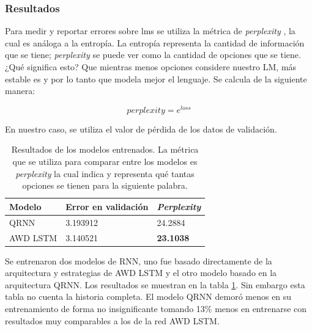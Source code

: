\subsubsection{Resultados}

Para medir y reportar errores sobre \glspl{lm} se utiliza la métrica de \textit{perplexity} \parencite{jurafsky2014speech}, la cual es análoga a la entropía. La entropía representa la cantidad de información que se tiene; \textit{perplexity} se puede ver como la cantidad de opciones que se tiene. ¿Qué significa esto? Que mientras menos opciones considere nuestro LM, más estable es y por lo tanto que modela mejor el lenguaje. Se calcula de la siguiente manera:

$$ perplexity = e^{loss} $$

En nuestro caso, se utiliza el valor de pérdida de los datos de validación.

\begin{table}
\centering
\begin{tabular}{|l|l|l|}
\hline
Modelo & Error en validación & \textit{Perplexity} \\
\hline
QRNN & 3.193912 & 24.2884 \\
AWD LSTM & 3.140521 & \textbf{23.1038} \\
\hline
\end{tabular}
\caption{Resultados de los modelos entrenados. La métrica que se utiliza para comparar entre los modelos es \textit{perplexity} la cual indica y representa qué tantas opciones se tienen para la siguiente palabra.}
\label{tab:modresults}
\end{table}

Se entrenaron dos modelos de RNN, uno fue basado directamente de la arquitectura y estrategias de AWD LSTM  y el otro modelo basado en la arquitectura QRNN. Los resultados se muestran en la tabla \ref{tab:modresults}. Sin embargo esta tabla no cuenta la historia completa. El modelo QRNN demoró menos en su entrenamiento de forma no insignificante tomando 13\% menos en entrenarse con resultados muy comparables a los de la red AWD LSTM.

